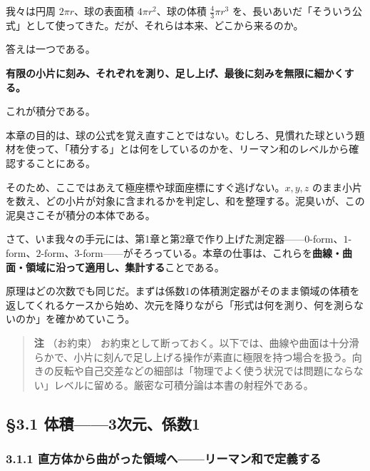 \documentclass[a4paper,12pt,openany]{book}
\begin{document}
我々は円周 \(2\pi r\)、球の表面積 \(4\pi r^2\)、球の体積
\(\frac{4}{3}\pi r^3\)
を、長いあいだ「そういう公式」として使ってきた。だが、それらは本来、どこから来るのか。

答えは一つである。

\textbf{有限の小片に刻み、それぞれを測り、足し上げ、最後に刻みを無限に細かくする。}

これが積分である。

本章の目的は、球の公式を覚え直すことではない。むしろ、見慣れた球という題材を使って、「積分する」とは何をしているのかを、リーマン和のレベルから確認することにある。

そのため、ここではあえて極座標や球面座標にすぐ逃げない。\(x,y,z\)
のまま小片を数え、どの小片が対象に含まれるかを判定し、和を整理する。泥臭いが、この泥臭さこそが積分の本体である。

さて、いま我々の手元には、第1章と第2章で作り上げた測定器——\(0\)-form、\(1\)-form、\(2\)-form、\(3\)-form——がそろっている。本章の仕事は、これらを\textbf{曲線・曲面・領域に沿って適用し、集計する}ことである。

原理はどの次数でも同じだ。まずは係数1の体積測定器がそのまま領域の体積を返してくれるケースから始め、次元を降りながら「形式は何を測り、何を測らないのか」を確かめていこう。

\begin{quote}
\textbf{注} （お約束）
お約束として断っておく。以下では、曲線や曲面は十分滑らかで、小片に刻んで足し上げる操作が素直に極限を持つ場合を扱う。向きの反転や自己交差などの細部は「物理でよく使う状況では問題にならない」レベルに留める。厳密な可積分論は本書の射程外である。
\end{quote}

\par\vspace{0.35em}\par

\hypertarget{ux4f53ux7a4d3ux6b21ux5143ux4fc2ux65701}{%
\subsection{§3.1
体積——3次元、係数1}\label{ux4f53ux7a4d3ux6b21ux5143ux4fc2ux65701}}

\hypertarget{ux76f4ux65b9ux4f53ux304bux3089ux66f2ux304cux3063ux305fux9818ux57dfux3078ux30eaux30fcux30deux30f3ux548cux3067ux5b9aux7fa9ux3059ux308b}{%
\subsubsection{3.1.1
直方体から曲がった領域へ——リーマン和で定義する}\label{ux76f4ux65b9ux4f53ux304bux3089ux66f2ux304cux3063ux305fux9818ux57dfux3078ux30eaux30fcux30deux30f3ux548cux3067ux5b9aux7fa9ux3059ux308b}}
\end{document}
